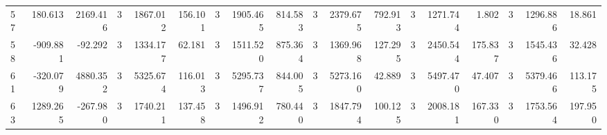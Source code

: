 \begin{table}[ht]
\begin{tabular}{lrrrrrrrrrrrrrrrrr}
57 & 180.613 & 2169.416 & 3 & 1867.012 & 156.101 & 3 & 1905.465 & 814.583 & 3 & 2379.675 & 792.913 & 3 & 1271.744 & 1.802 & 3 & 1296.886 & 18.861 \\
58 & -909.881 & -92.292 & 3 & 1334.177 & 62.181 & 3 & 1511.520 & 875.364 & 3 & 1369.968 & 127.295 & 3 & 2450.544 & 175.837 & 3 & 1545.436 & 32.428 \\
61 & -320.079 & 4880.352 & 3 & 5325.674 & 116.013 & 3 & 5295.737 & 844.005 & 3 & 5273.160 & 42.889 & 3 & 5497.470 & 47.407 & 3 & 5379.466 & 113.175 \\
63 & 1289.265 & -267.980 & 3 & 1740.211 & 137.458 & 3 & 1496.912 & 780.440 & 3 & 1847.794 & 100.125 & 3 & 2008.181 & 167.330 & 3 & 1753.564 & 197.950 \\
\hline
\end{tabular}
\end{table}
